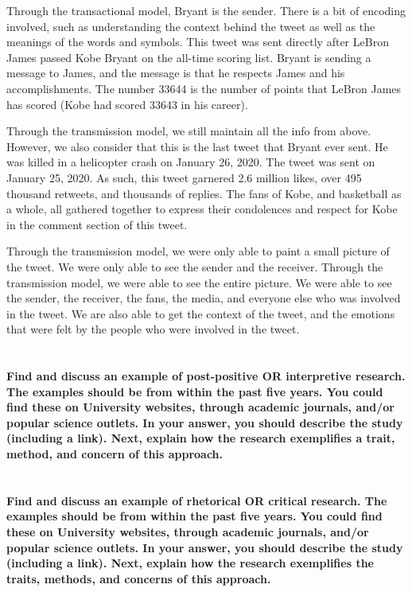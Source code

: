 \documentclass[a4paper]{article}
\begin{document}
        Through the transactional model, Bryant is the sender. There is a bit of encoding involved, such as understanding
        the context behind the tweet as well as the meanings of the words and symbols. This tweet was sent directly 
        after LeBron James passed Kobe Bryant on the all-time scoring list. Bryant is sending a message to James, and the
        message is that he respects James and his accomplishments. The number 33644 is the number of points that 
        LeBron James has scored (Kobe had scored 33643 in his career). 

        Through the transmission model, we still maintain all the info from above. However, we also consider that this is 
        the last tweet that Bryant ever sent. He was killed in a helicopter crash on January 26, 2020. The tweet was sent
        on January 25, 2020. As such, this tweet garnered 2.6 million likes, over 495 thousand retweets, and 
        thousands of replies. The fans of Kobe, and basketball as a whole, all gathered together to express their 
        condolences and respect for Kobe in the comment section of this tweet. 

        Through the transmission model, we were only able to paint a small picture of the tweet. We were only able to see
        the sender and the receiver. Through the transmission model, we were able to see the entire picture. We were able
        to see the sender, the receiver, the fans, the media, and everyone else who was involved in the tweet. We are also 
        able to get the context of the tweet, and the emotions that were felt by the people who were involved in the tweet.

    \section{}
        \textbf{Find and discuss an example of post-positive OR interpretive research. The examples should be from within the past five years. You could find these on University websites, through academic journals, and/or popular science outlets. In your answer, you should describe the study (including a link). Next, explain how the research exemplifies a trait, method, and concern of this approach.}

    \section{}
        \textbf{Find and discuss an example of rhetorical OR critical research. The examples should be from within the past five years. You could find these on University websites, through academic journals, and/or popular science outlets. In your answer, you should describe the study (including a link). Next, explain how the research exemplifies the traits, methods, and concerns of this approach.}
    
	\pagebreak    
    
    
    \cite{wood2017}
    \cite{kobeTweet}
\end{document}

